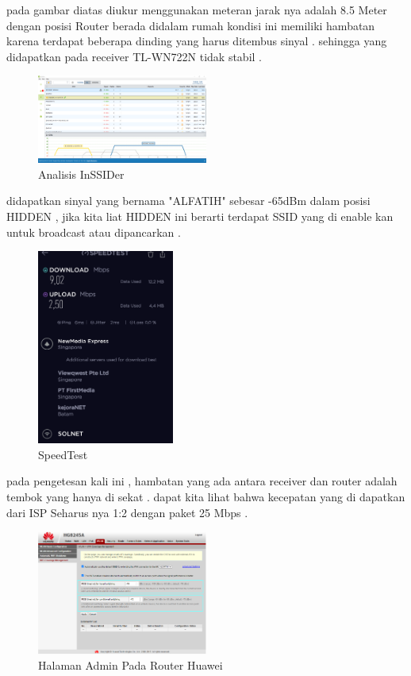 \documentclass[conference]{IEEEtran}
\begin{document}
pada gambar diatas diukur menggunakan meteran jarak nya adalah 8.5 Meter dengan posisi Router berada didalam rumah 
kondisi ini memiliki hambatan karena terdapat beberapa dinding yang harus ditembus sinyal . sehingga yang didapatkan pada receiver TL-WN722N tidak stabil .

\begin{figure}[h]
    \centering
    \includegraphics[width=0.5\textwidth]{gambar-inssider.png}
    \caption{Analisis InSSIDer}
\end{figure}

didapatkan sinyal yang bernama "ALFATIH" sebesar -65dBm dalam posisi HIDDEN , jika kita liat HIDDEN ini berarti terdapat SSID yang di enable kan untuk broadcast atau dipancarkan .

\begin{figure}[h]
    \centering
    \includegraphics[width=0.4\textwidth]{speedtest.png}
    \caption{SpeedTest}
\end{figure}

pada pengetesan kali ini , hambatan yang ada antara receiver dan router adalah tembok yang hanya di sekat . dapat kita lihat bahwa kecepatan yang di dapatkan dari ISP Seharus nya 1:2 dengan paket 25 Mbps .

\begin{figure}[h]
    \centering
    \includegraphics[width=0.5\textwidth]{router.png}
    \caption{Halaman Admin Pada Router Huawei}
\end{figure}
\end{document}
